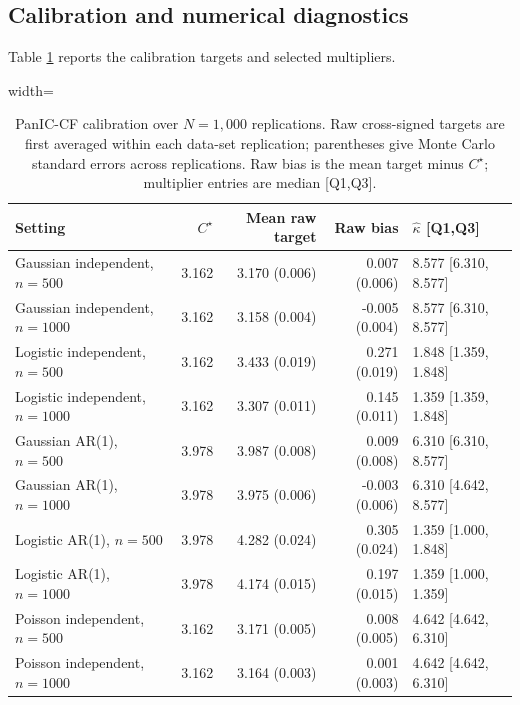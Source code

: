 \documentclass[12pt]{article}
\newenvironment{bluechange}{\begingroup\color[rgb]{0.00,0.00,1.00}}{\endgroup}
\theoremstyle{remark}
\theoremstyle{plain}
\begin{document}
\begin{bluechange}
\subsection{Calibration and numerical diagnostics}
Table \ref{Table: revised calibration} reports the calibration targets and
selected multipliers.
\begin{table}[H]
\centering
\caption{PanIC-CF calibration over $N=1{,}000$ replications. Raw cross-signed targets are first averaged within each data-set replication; parentheses give Monte Carlo standard errors across replications. Raw bias is the mean target minus $C^\star$; multiplier entries are median [Q1,Q3].}
\label{Table: revised calibration}
\begin{adjustbox}{width=\textwidth}
\scriptsize
\begin{tabular}{lrrrl}
\hline
Setting & $C^\star$ & Mean raw target & Raw bias & $\widehat\kappa$ [Q1,Q3] \\
\hline
Gaussian independent, $n=500$ & 3.162 & 3.170 (0.006) & 0.007 (0.006) & 8.577 [6.310, 8.577] \\
Gaussian independent, $n=1000$ & 3.162 & 3.158 (0.004) & -0.005 (0.004) & 8.577 [6.310, 8.577] \\
Logistic independent, $n=500$ & 3.162 & 3.433 (0.019) & 0.271 (0.019) & 1.848 [1.359, 1.848] \\
Logistic independent, $n=1000$ & 3.162 & 3.307 (0.011) & 0.145 (0.011) & 1.359 [1.359, 1.848] \\
Gaussian AR(1), $n=500$ & 3.978 & 3.987 (0.008) & 0.009 (0.008) & 6.310 [6.310, 8.577] \\
Gaussian AR(1), $n=1000$ & 3.978 & 3.975 (0.006) & -0.003 (0.006) & 6.310 [4.642, 8.577] \\
Logistic AR(1), $n=500$ & 3.978 & 4.282 (0.024) & 0.305 (0.024) & 1.359 [1.000, 1.848] \\
Logistic AR(1), $n=1000$ & 3.978 & 4.174 (0.015) & 0.197 (0.015) & 1.359 [1.000, 1.359] \\
Poisson independent, $n=500$ & 3.162 & 3.171 (0.005) & 0.008 (0.005) & 4.642 [4.642, 6.310] \\
Poisson independent, $n=1000$ & 3.162 & 3.164 (0.003) & 0.001 (0.003) & 4.642 [4.642, 6.310] \\
\hline
\end{tabular}
\end{adjustbox}
\end{table}



\end{bluechange}
\end{document}
